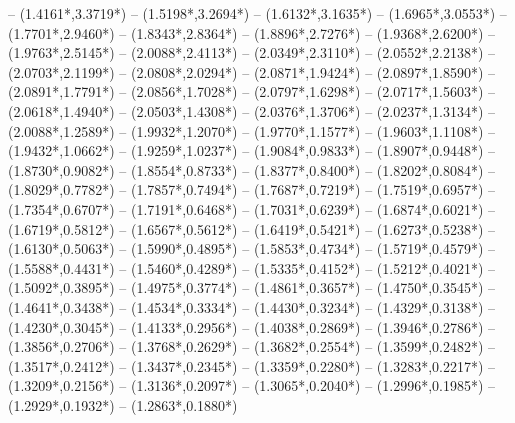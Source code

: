 {	-- ({1.4161*\dx},{3.3719*\dy})
	-- ({1.5198*\dx},{3.2694*\dy})
	-- ({1.6132*\dx},{3.1635*\dy})
	-- ({1.6965*\dx},{3.0553*\dy})
	-- ({1.7701*\dx},{2.9460*\dy})
	-- ({1.8343*\dx},{2.8364*\dy})
	-- ({1.8896*\dx},{2.7276*\dy})
	-- ({1.9368*\dx},{2.6200*\dy})
	-- ({1.9763*\dx},{2.5145*\dy})
	-- ({2.0088*\dx},{2.4113*\dy})
	-- ({2.0349*\dx},{2.3110*\dy})
	-- ({2.0552*\dx},{2.2138*\dy})
	-- ({2.0703*\dx},{2.1199*\dy})
	-- ({2.0808*\dx},{2.0294*\dy})
	-- ({2.0871*\dx},{1.9424*\dy})
	-- ({2.0897*\dx},{1.8590*\dy})
	-- ({2.0891*\dx},{1.7791*\dy})
	-- ({2.0856*\dx},{1.7028*\dy})
	-- ({2.0797*\dx},{1.6298*\dy})
	-- ({2.0717*\dx},{1.5603*\dy})
	-- ({2.0618*\dx},{1.4940*\dy})
	-- ({2.0503*\dx},{1.4308*\dy})
	-- ({2.0376*\dx},{1.3706*\dy})
	-- ({2.0237*\dx},{1.3134*\dy})
	-- ({2.0088*\dx},{1.2589*\dy})
	-- ({1.9932*\dx},{1.2070*\dy})
	-- ({1.9770*\dx},{1.1577*\dy})
	-- ({1.9603*\dx},{1.1108*\dy})
	-- ({1.9432*\dx},{1.0662*\dy})
	-- ({1.9259*\dx},{1.0237*\dy})
	-- ({1.9084*\dx},{0.9833*\dy})
	-- ({1.8907*\dx},{0.9448*\dy})
	-- ({1.8730*\dx},{0.9082*\dy})
	-- ({1.8554*\dx},{0.8733*\dy})
	-- ({1.8377*\dx},{0.8400*\dy})
	-- ({1.8202*\dx},{0.8084*\dy})
	-- ({1.8029*\dx},{0.7782*\dy})
	-- ({1.7857*\dx},{0.7494*\dy})
	-- ({1.7687*\dx},{0.7219*\dy})
	-- ({1.7519*\dx},{0.6957*\dy})
	-- ({1.7354*\dx},{0.6707*\dy})
	-- ({1.7191*\dx},{0.6468*\dy})
	-- ({1.7031*\dx},{0.6239*\dy})
	-- ({1.6874*\dx},{0.6021*\dy})
	-- ({1.6719*\dx},{0.5812*\dy})
	-- ({1.6567*\dx},{0.5612*\dy})
	-- ({1.6419*\dx},{0.5421*\dy})
	-- ({1.6273*\dx},{0.5238*\dy})
	-- ({1.6130*\dx},{0.5063*\dy})
	-- ({1.5990*\dx},{0.4895*\dy})
	-- ({1.5853*\dx},{0.4734*\dy})
	-- ({1.5719*\dx},{0.4579*\dy})
	-- ({1.5588*\dx},{0.4431*\dy})
	-- ({1.5460*\dx},{0.4289*\dy})
	-- ({1.5335*\dx},{0.4152*\dy})
	-- ({1.5212*\dx},{0.4021*\dy})
	-- ({1.5092*\dx},{0.3895*\dy})
	-- ({1.4975*\dx},{0.3774*\dy})
	-- ({1.4861*\dx},{0.3657*\dy})
	-- ({1.4750*\dx},{0.3545*\dy})
	-- ({1.4641*\dx},{0.3438*\dy})
	-- ({1.4534*\dx},{0.3334*\dy})
	-- ({1.4430*\dx},{0.3234*\dy})
	-- ({1.4329*\dx},{0.3138*\dy})
	-- ({1.4230*\dx},{0.3045*\dy})
	-- ({1.4133*\dx},{0.2956*\dy})
	-- ({1.4038*\dx},{0.2869*\dy})
	-- ({1.3946*\dx},{0.2786*\dy})
	-- ({1.3856*\dx},{0.2706*\dy})
	-- ({1.3768*\dx},{0.2629*\dy})
	-- ({1.3682*\dx},{0.2554*\dy})
	-- ({1.3599*\dx},{0.2482*\dy})
	-- ({1.3517*\dx},{0.2412*\dy})
	-- ({1.3437*\dx},{0.2345*\dy})
	-- ({1.3359*\dx},{0.2280*\dy})
	-- ({1.3283*\dx},{0.2217*\dy})
	-- ({1.3209*\dx},{0.2156*\dy})
	-- ({1.3136*\dx},{0.2097*\dy})
	-- ({1.3065*\dx},{0.2040*\dy})
	-- ({1.2996*\dx},{0.1985*\dy})
	-- ({1.2929*\dx},{0.1932*\dy})
	-- ({1.2863*\dx},{0.1880*\dy})
}
